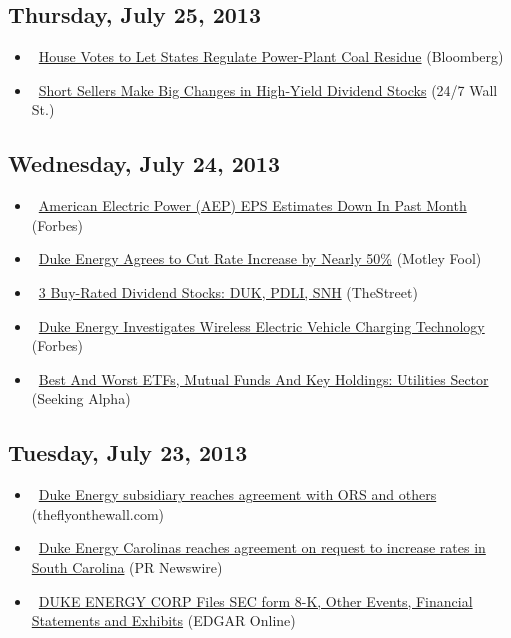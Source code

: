 \documentclass[11pt,asymmetric]{article}
\begin{document}
\subsection*{Thursday, July 25, 2013}
\begin{itemize}
\item\ \href{http://www.bloomberg.com/news/2013-07-25/house-votes-to-let-states-regulate-power-plant-coal-residue.html?cmpid=yhoo}{House Votes to Let States Regulate Power-Plant Coal Residue} (Bloomberg)
\item\ \href{http://finance.yahoo.com/news/short-sellers-big-changes-high-133529554.html}{Short Sellers Make Big Changes in High-Yield Dividend Stocks} (24/7 Wall St.)
\end{itemize}
\subsection*{Wednesday, July 24, 2013}
\begin{itemize}
\item\ \href{http://www.forbes.com/sites/narrativescience/2013/07/24/american-electric-power-aep-eps-estimates-down-in-past-month/?partner=yahootix}{American Electric Power (AEP) EPS Estimates Down In Past Month} (Forbes)
\item\ \href{http://www.fool.com/investing/general/2013/07/24/duke-energy-rate-request-cut-nearly-50.aspx?source=eogyholnk0000001}{Duke Energy Agrees to Cut Rate Increase by Nearly 50\%} (Motley Fool)
\item\ \href{http://www.thestreet.com/story/11987931/1/3-buy-rated-dividend-stocks-duk-pdli-snh.html?puc=yahoo&cm_ven=YAHOO}{3 Buy-Rated Dividend Stocks: DUK, PDLI, SNH} (TheStreet)
\item\ \href{http://www.forbes.com/sites/peterdetwiler/2013/07/24/duke-energy-investigates-wireless-electric-vehicle-charging-technology/?partner=yahootix}{Duke Energy Investigates Wireless Electric Vehicle Charging Technology} (Forbes)
\item\ \href{http://seekingalpha.com/article/1566442-best-and-worst-etfs-mutual-funds-and-key-holdings-utilities-sector?source=yahoo}{Best And Worst ETFs, Mutual Funds And Key Holdings: Utilities Sector} (Seeking Alpha)
\end{itemize}
\subsection*{Tuesday, July 23, 2013}
\begin{itemize}
\item\ \href{http://finance.yahoo.com/news/duke-energy-subsidiary-reaches-agreement-204407760.html}{Duke Energy subsidiary reaches agreement with ORS and others} (theflyonthewall.com)
\item\ \href{http://finance.yahoo.com/news/duke-energy-carolinas-reaches-agreement-204000164.html}{Duke Energy Carolinas reaches agreement on request to increase rates in South Carolina} (PR Newswire)
\item\ \href{http://biz.yahoo.com/e/130723/duk8-k.html}{DUKE ENERGY CORP Files SEC form 8-K, Other Events, Financial Statements and Exhibits} (EDGAR Online)
\end{itemize}
\end{document}
